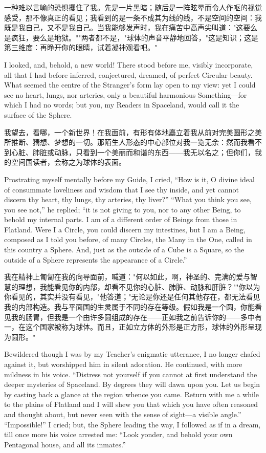 \documentclass[12pt,UTF8]{ctexbook}
\begin{document}
一种难以言喻的恐惧攫住了我。先是一片黑暗；随后是一阵眩晕而令人作呕的视觉感受，那不像真正的看见；我看到的是一条不成其为线的线，不是空间的空间：我既是我自己，又不是我自己。当我能够发声时，我在痛苦中高声尖叫道："这要么是疯狂，要么是地狱。""两者都不是，"球体的声音平静地回答，"这是知识；这是第三维度：再睁开你的眼睛，试着凝神观看吧。"

I looked, and, behold, a new world! There stood before me, visibly incorporate, all that I had before inferred, conjectured, dreamed, of perfect Circular beauty. What seemed the centre of the Stranger's form lay open to my view: yet I could see no heart, lungs, nor arteries, only a beautiful harmonious Something---for which I had no words; but you, my Readers in Spaceland, would call it the surface of the Sphere.

我望去，看哪，一个新世界！在我面前，有形有体地矗立着我从前对完美圆形之美所推断、猜想、梦想的一切。那陌生人形态的中心部位对我一览无余：然而我看不到心脏、肺脏或动脉，只看到一个美丽而和谐的东西——我无以名之；但你们，我的空间国读者，会称之为球体的表面。

Prostrating myself mentally before my Guide, I cried, ``How is it, O divine ideal of consummate loveliness and wisdom that I see thy inside, and yet cannot discern thy heart, thy lungs, thy arteries, thy liver?'' ``What you think you see, you see not,'' he replied; ``it is not giving to you, nor to any other Being, to behold my internal parts. I am of a different order of Beings from those in Flatland. Were I a Circle, you could discern my intestines, but I am a Being, composed as I told you before, of many Circles, the Many in the One, called in this country a Sphere. And, just as the outside of a Cube is a Square, so the outside of a Sphere represents the appearance of a Circle.''

我在精神上匍匐在我的向导面前，喊道："何以如此，啊，神圣的、完满的爱与智慧的理想，我能看见你的内部，却看不见你的心脏、肺脏、动脉和肝脏？""你以为你看见的，其实并没有看见，"他答道；"无论是你还是任何其他存在，都无法看见我的内部构造。我与平面国的生灵属于不同的存在等级。假如我是一个圆，你能看见我的肠胃，但我是一个由许多圆组成的存在——正如我之前告诉你的——多中有一，在这个国家被称为球体。而且，正如立方体的外形是正方形，球体的外形呈现为圆形。"

Bewildered though I was by my Teacher's enigmatic utterance, I no longer chafed against it, but worshipped him in silent adoration. He continued, with more mildness in his voice. ``Distress not yourself if you cannot at first understand the deeper mysteries of Spaceland. By degrees they will dawn upon you. Let us begin by casting back a glance at the region whence you came. Return with me a while to the plains of Flatland and I will shew you that which you have often reasoned and thought about, but never seen with the sense of sight---a visible angle.'' ``Impossible!'' I cried; but, the Sphere leading the way, I followed as if in a dream, till once more his voice arrested me: ``Look yonder, and behold your own Pentagonal house, and all its inmates.''
\end{document}
